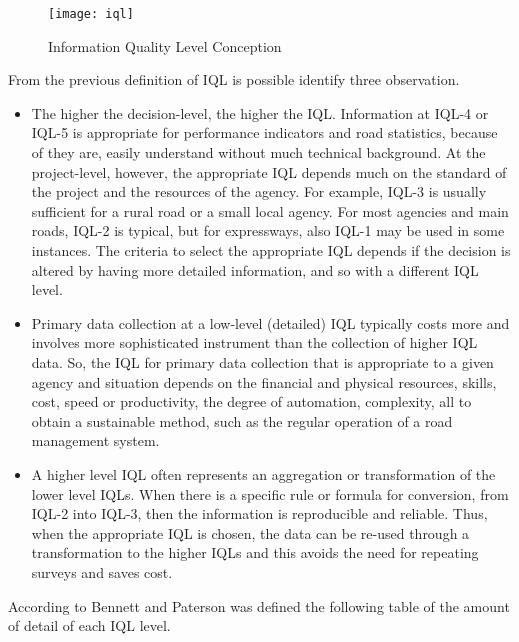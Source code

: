 \documentclass[tesi]{subfiles}
\begin{document}
\begin{figure}[ht]
\centering
\texttt{[image: iql]}
\caption{Information Quality Level Conception}
\label{fig:Information Quality Level Conception}
\end{figure}

\clearpage
From the previous definition of IQL is possible identify three observation.

\begin{itemize}

\item The higher the decision-level, the higher the IQL. Information at IQL-4 or IQL-5 is appropriate for performance indicators and road statistics, because of they are, easily understand without much technical background.
At the project-level, however, the appropriate IQL depends much on the standard of the project and the resources of the agency. For example, IQL-3 is usually sufficient for a rural road or a small local agency. For
most agencies and main roads, IQL-2 is typical, but for expressways, also IQL-1 may be used in some instances.
The criteria to select the appropriate IQL depends if the decision is altered by having more detailed information, and so with a different IQL level.

\item Primary data collection at a low-level (detailed) IQL typically costs more and involves more sophisticated instrument than the collection of higher IQL data. So, the IQL for primary data collection that is appropriate to a
given agency and situation depends on the financial and physical resources, skills, cost, speed or productivity, the degree of automation, complexity, all to obtain a  sustainable method, such as the regular operation of a road management system.

\item A higher level IQL often represents an aggregation or transformation of the lower level IQLs. When there is a specific rule or formula for conversion, from IQL-2 into IQL-3, then the information is reproducible and reliable. Thus, when the appropriate IQL is chosen, the
data can be re-used through a transformation to the higher IQLs and this avoids the need for repeating surveys and saves cost.


\end{itemize}
\clearpage
\noindent According to Bennett and Paterson\cite{bennett2000guide} was defined the following table of the amount of detail of each IQL level.
\end{document}
